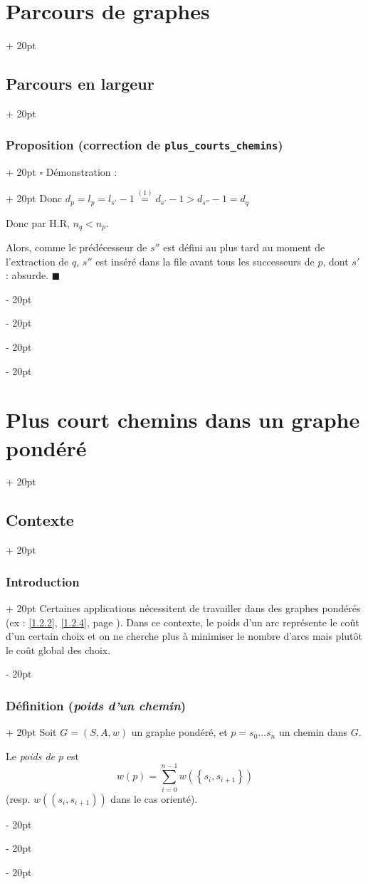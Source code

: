 \documentclass[a4paper, 12pt, twoside]{article}
\newcommand{\lr}[1]{\left( #1 \right)}
\newcommand{\set}[1]{\left\{ #1 \right\}}
\newcommand{\ind}[1][20pt]{\advance\leftskip + #1}
\newcommand{\deind}[1][20pt]{\advance\leftskip - #1}
\newenvironment{indt}[2][20pt]{#2 \par \ind[#1]}{\par \deind} %
\begin{document}
\begin{indt}{\section{Parcours de graphes}}
\begin{indt}{\subsection{Parcours en largeur}}
\begin{indt}{\subsubsection{Proposition (correction de \texttt{plus\_courts\_chemins})}}
\begin{indt}{$\square$ Démonstration :}
                    Donc $d_p = l_p = l_{s'} - 1 \overset{(1)}{=} d_{s'} - 1 > d_{s''} - 1 = d_q$

                    Donc par H.R, $n_q < n_p$.

                    Alors, comme le prédécesseur de $s''$ est défini au plus tard au moment de l'extraction de $q$, $s''$ est inséré dans la file avant tous les successeurs de $p$, dont $s'$ : absurde. $\blacksquare$
                \end{indt}
            \end{indt}
        \end{indt}
    \end{indt}

    \vspace{12pt}
    
    \begin{indt}{\section{Plus court chemins dans un graphe pondéré}}
        \begin{indt}{\subsection{Contexte}}
            \begin{indt}{\subsubsection{Introduction}}
                Certaines applications nécessitent de travailler dans des graphes pondérés (ex : \ref{1.2.2}, \ref{1.2.4}, page \pageref{1.2.2}).
                Dans ce contexte, le poids d'un arc représente le coût d'un certain choix et on ne cherche plus à minimiser le nombre d'arcs mais plutôt le coût global des choix.
            \end{indt}

            \vspace{12pt}
            
            \begin{indt}{\subsubsection{Définition (\textit{poids d'un chemin})}}
                Soit $G = (S, A, w)$ un graphe pondéré, et $p = s_0 \ldots s_n$ un chemin dans $G$.

                Le \textit{poids de $p$} est
                \[
                    w(p) = \sum_{i = 0}^{n - 1} w\!\lr{\set{s_i, s_{i + 1}}}
                \]
                (resp. $w\!\lr{(s_i, s_{i + 1})}$ dans le cas orienté).
            \end{indt}


\end{indt}
\end{indt}
\end{document}
